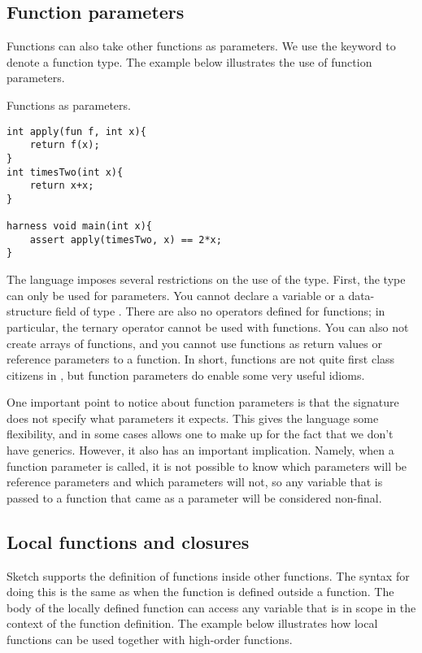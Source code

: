 \subsection{Function parameters}
Functions can also take other functions as parameters. We use the keyword  to denote a function type. The example below illustrates the use of function parameters.
\begin{Example}
Functions as parameters.
\begin{lstlisting}
int apply(fun f, int x){
	return f(x);
}
int timesTwo(int x){
	return x+x;
}

harness void main(int x){
	assert apply(timesTwo, x) == 2*x;
}
\end{lstlisting}
\end{Example}

The language imposes several restrictions on the use of the  type. First, the type can only be used for parameters. You cannot declare a variable or a data-structure field of type . There are also no operators defined for functions; in particular, the ternary operator  cannot be used with functions. You can also not create arrays of functions, and you cannot use functions as return values or reference parameters to a function. In short, functions are not quite first class citizens in \Sk{}, but function parameters do enable some very useful idioms.

One important point to notice about function parameters is that the signature does not specify what parameters it expects. This gives the language some flexibility, and in some cases allows one to make up for the fact that we don't have generics. However, it also has an important implication. Namely, when a function parameter is called, it is not possible to know which parameters will be reference parameters and which parameters will not, so any variable that is passed to a function that came as a parameter will be considered non-final.

\subsection{Local functions and closures}
Sketch supports the definition of functions inside other functions. The syntax for doing this is the same as when the function is defined outside a function. The body of the locally defined function can access any variable that is in scope in the context of the function definition. The example below illustrates how local functions can be used together with high-order functions. 

